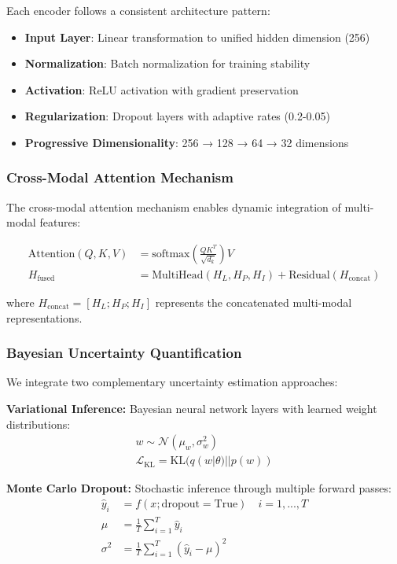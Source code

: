 \documentclass[11pt,a4paper]{article}
\begin{document}
Each encoder follows a consistent architecture pattern:
\begin{itemize}
    \item \textbf{Input Layer}: Linear transformation to unified hidden dimension (256)
    \item \textbf{Normalization}: Batch normalization for training stability
    \item \textbf{Activation}: ReLU activation with gradient preservation
    \item \textbf{Regularization}: Dropout layers with adaptive rates (0.2-0.05)
    \item \textbf{Progressive Dimensionality}: 256 → 128 → 64 → 32 dimensions
\end{itemize}

\subsubsection{Cross-Modal Attention Mechanism}

The cross-modal attention mechanism enables dynamic integration of multi-modal features:

\begin{align}
\text{Attention}(Q, K, V) &= \text{softmax}\left(\frac{QK^T}{\sqrt{d_k}}\right)V \\
H_{\text{fused}} &= \text{MultiHead}(H_L, H_P, H_I) + \text{Residual}(H_{\text{concat}})
\end{align}

where $H_{\text{concat}} = [H_L; H_P; H_I]$ represents the concatenated multi-modal representations.

\subsubsection{Bayesian Uncertainty Quantification}

We integrate two complementary uncertainty estimation approaches:

\textbf{Variational Inference:} Bayesian neural network layers with learned weight distributions:
\begin{align}
w \sim \mathcal{N}(\mu_w, \sigma_w^2) \\
\mathcal{L}_{\text{KL}} = \text{KL}(q(w|\theta) || p(w))
\end{align}

\textbf{Monte Carlo Dropout:} Stochastic inference through multiple forward passes:
\begin{align}
\hat{y}_i &= f(x; \text{dropout}=\text{True}) \quad i = 1, ..., T \\
\mu &= \frac{1}{T}\sum_{i=1}^T \hat{y}_i \\
\sigma^2 &= \frac{1}{T}\sum_{i=1}^T (\hat{y}_i - \mu)^2
\end{align}
\end{document}
